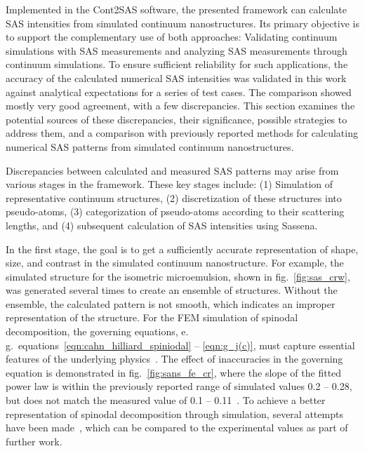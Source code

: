 \documentclass[preprint, 5p, times, twocolumn]{elsarticle}
\begin{document}
Implemented in the Cont2SAS software, the presented framework can calculate SAS intensities from simulated continuum nanostructures. Its primary objective is to support the complementary use of both approaches: Validating continuum simulations with SAS measurements and analyzing SAS measurements through continuum simulations. To ensure sufficient reliability for such applications, the accuracy of the calculated numerical SAS intensities was validated in this work against analytical expectations for a series of test cases. The comparison showed mostly very good agreement, with a few discrepancies. This section examines the potential sources of these discrepancies, their significance, possible strategies to address them, and a comparison with previously reported methods for calculating numerical SAS patterns from simulated continuum nanostructures.

Discrepancies between calculated and measured SAS patterns may arise from various stages in the framework. These key stages include: (1) Simulation of representative continuum structures, (2) discretization of these structures into pseudo-atoms, (3) categorization of pseudo-atoms according to their scattering lengths, and (4) subsequent calculation of SAS intensities using Sassena.

In the first stage, the goal is to get a sufficiently accurate representation of shape, size, and contrast in the simulated continuum nanostructure. For example, the simulated structure for the isometric microemulsion, shown in fig.~\ref{fig:sas_crw}, was generated several times to create an ensemble of structures. Without the ensemble, the calculated pattern is not smooth, which indicates an improper representation of the structure. For the FEM simulation of  spinodal decomposition, the governing equations, e.\,g.\ equations~\ref{eqn:cahn_hilliard_spiniodal} -- \ref{eqn:g_j(c)}, must capture essential features of the underlying physics~\cite{liu2021calphad}. The effect of inaccuracies in the governing equation is demonstrated in fig.~\ref{fig:sans_fe_cr}, where the slope of the fitted power law is within the previously reported range of simulated values 0.2 -- 0.28, but does not match the measured value of 0.1 -- 0.11~\cite{hoernqvist2015early}. To achieve a better representation of  spinodal decomposition through simulation, several attempts have been made~\cite{xiong2011investigation, hedstrom2012phase, yang2023effects}, which can be compared to the experimental values as part of further work. 
\end{document}
